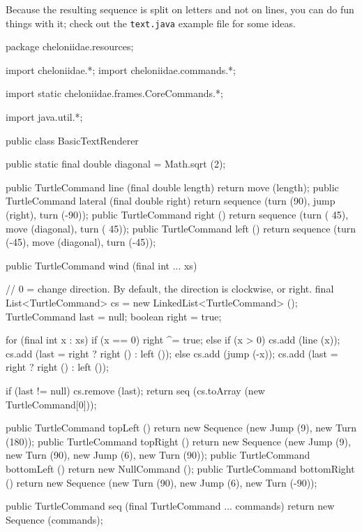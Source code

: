 \documentclass{report}
\begin{document}
      Because the resulting sequence is split on letters and not on lines, you can do fun things with it; check out the {\tt text.java} example file for some
      ideas.

\begin{javacode}
package cheloniidae.resources;

import cheloniidae.*;
import cheloniidae.commands.*;

import static cheloniidae.frames.CoreCommands.*;

import java.util.*;

public class BasicTextRenderer {
  public static final double diagonal = Math.sqrt (2);

  public TurtleCommand line    (final double length) {return move (length);}
  public TurtleCommand lateral (final double right)  {return sequence (turn (90), jump (right), turn (-90));}
  public TurtleCommand right   ()                    {return sequence (turn ( 45), move (diagonal), turn ( 45));}
  public TurtleCommand left    ()                    {return sequence (turn (-45), move (diagonal), turn (-45));}

  public TurtleCommand wind    (final int ... xs) {
    // 0 = change direction. By default, the direction is clockwise, or right.
    final List<TurtleCommand> cs    = new LinkedList<TurtleCommand> ();
    TurtleCommand             last  = null;
    boolean                   right = true;

    for (final int x : xs) if (x == 0) right ^= true;
                           else if (x > 0) {
                             cs.add (line (x));
                             cs.add (last = right ? right () : left ());
                           } else {
                             cs.add (jump (-x));
                             cs.add (last = right ? right () : left ());
                           }

    if (last != null) cs.remove (last);
    return seq (cs.toArray (new TurtleCommand[0]));
  }

  public TurtleCommand topLeft     () {return new Sequence (new Jump (9), new Turn (180));}
  public TurtleCommand topRight    () {return new Sequence (new Jump (9), new Turn (90), new Jump (6), new Turn (90));}
  public TurtleCommand bottomLeft  () {return new NullCommand ();}
  public TurtleCommand bottomRight () {return new Sequence (new Turn (90), new Jump (6), new Turn (-90));}

  public TurtleCommand seq (final TurtleCommand ... commands) {return new Sequence (commands);}

}
\end{javacode}
\end{document}
